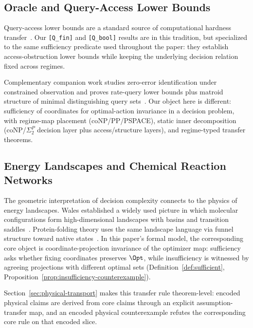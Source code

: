 \subsection{Oracle and Query-Access Lower Bounds}

Query-access lower bounds are a standard source of computational hardness transfer~\cite{dobzinski2012query,buhrman2002complexity}. Our \texttt{[Q\_fin]} and \texttt{[Q\_bool]} results are in this tradition, but specialized to the same sufficiency predicate used throughout the paper: they establish access-obstruction lower bounds while keeping the underlying decision relation fixed across regimes.

Complementary companion work studies zero-error identification under constrained observation and proves rate-query lower bounds plus matroid structure of minimal distinguishing query sets~\cite{simas2026identification}. Our object here is different: sufficiency of coordinates for optimal-action invariance in a decision problem, with regime-map placement (coNP/PP/PSPACE), static inner decomposition (coNP/$\Sigma_2^P$ decision layer plus access/structure layers), and regime-typed transfer theorems.

\subsection{Energy Landscapes and Chemical Reaction Networks}

The geometric interpretation of decision complexity connects to the physics of energy landscapes. Wales established a widely used picture in which molecular configurations form high-dimensional landscapes with basins and transition saddles~\cite{wales2003energy,wales2005energy,wales2018exploring}. Protein-folding theory uses the same landscape language via funnel structure toward native states~\cite{onuchic1997protein}. In this paper's formal model, the corresponding core object is coordinate-projection invariance of the optimizer map: sufficiency asks whether fixing coordinates preserves \(\Opt\), while insufficiency is witnessed by agreeing projections with different optimal sets (Definition~\ref{def:sufficient}, Proposition~\ref{prop:insufficiency-counterexample}).

Section~\ref{sec:physical-transport} makes this transfer rule theorem-level: encoded physical claims are derived from core claims through an explicit assumption-transfer map, and an encoded physical counterexample refutes the corresponding core rule on that encoded slice.

